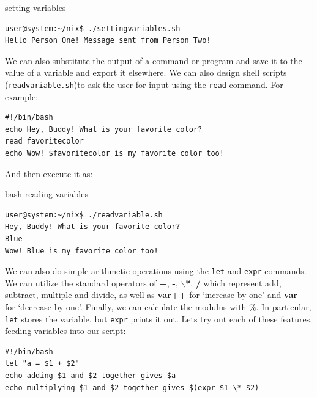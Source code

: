 \documentclass[11pt]{article}
\begin{document}
\begin{listing}[H]
\caption{setting variables}\vspace{-0.1in}
\begin{verbatim}
user@system:~/nix$ ./settingvariables.sh
Hello Person One! Message sent from Person Two!
\end{verbatim}
\end{listing}
We can also substitute the output of a command or program and save it to the value of a variable and export it elsewhere. We can also design shell scripts (\texttt{readvariable.sh})to ask the user for input using the \texttt{read} command. For example:\\

\begin{listing}[H]
\begin{verbatim}
#!/bin/bash
echo Hey, Buddy! What is your favorite color?
read favoritecolor
echo Wow! $favoritecolor is my favorite color too!
\end{verbatim}
\end{listing}

And then execute it as:\\

\begin{listing}[H]
\caption{bash reading variables}\vspace{-0.1in}
\begin{verbatim}
user@system:~/nix$ ./readvariable.sh
Hey, Buddy! What is your favorite color?
Blue
Wow! Blue is my favorite color too!
\end{verbatim}
\end{listing}

We can also do simple arithmetic operations using the \texttt{let} and \texttt{expr} commands. We can utilize the standard operators of \textbf{+}, \textbf{-}, \textbf{$\backslash$*},\textbf{ /} which represent add, subtract, multiple and divide, as well as \textbf{var++} for `increase by one' and \textbf{var--} for `decrease by one'. Finally, we can calculate the modulus with \%. In particular, \texttt{let} stores the variable, but \texttt{expr} prints it out. Lets try out each of these features, feeding variables into our script: \\

\begin{listing}[H]
\begin{verbatim}
#!/bin/bash
let "a = $1 + $2"
echo adding $1 and $2 together gives $a
echo multiplying $1 and $2 together gives $(expr $1 \* $2)
\end{verbatim}
\end{listing}
\end{document}
